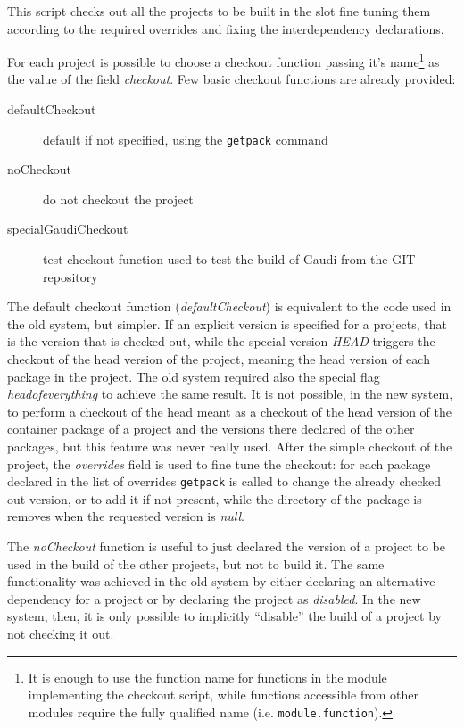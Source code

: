 \documentclass{lhcbnote}
\begin{document}
This script checks out all the projects to be built in the slot fine tuning them
according to the required overrides and fixing the interdependency declarations.

For each project is possible to choose a checkout function passing it's
name\footnote{It is enough to use the function name for functions in the module
implementing the checkout script, while functions accessible from other modules
require the fully qualified name (i.e. \texttt{module.function}).} as the value
of the field \emph{checkout}.  Few basic checkout functions are already
provided:
\begin{description}
  \item[defaultCheckout] default if not specified, using the \texttt{getpack}
  command
  \item[noCheckout] do not checkout the project
  \item[specialGaudiCheckout] test checkout function used to test the build of
  Gaudi from the GIT repository
\end{description}

The default checkout function (\emph{defaultCheckout}) is equivalent to the code
used in the old system, but simpler.  If an explicit version is specified for a
projects, that is the version that is checked out, while the special version
\emph{HEAD} triggers the checkout of the head version of the project, meaning
the head version of each package in the project.  The old system required also
the special flag \emph{headofeverything} to achieve the same result.  It is not
possible, in the new system, to perform a checkout of the head meant as a
checkout of the head version of the container package of a project and the
versions there declared of the other packages, but this feature was never really
used.  After the simple checkout of the project, the \emph{overrides} field is
used to fine tune the checkout: for each package declared in the list of
overrides \texttt{getpack} is called to change the already checked out version,
or to add it if not present, while the directory of the package is removes when
the requested version is \emph{null}.

The \emph{noCheckout} function is useful to just declared the version of a
project to be used in the build of the other projects, but not to build it.  The
same functionality was achieved in the old system by either declaring an
alternative dependency for a project or by declaring the project as
\emph{disabled}.  In the new system, then, it is only possible to implicitly
``disable'' the build of a project by not checking it out.
\end{document}
